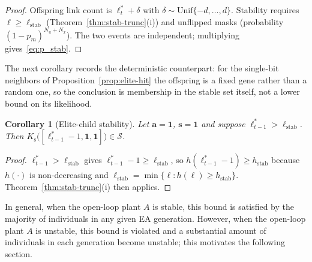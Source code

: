 \documentclass[letterpaper, 10pt, conference]{ieeeconf}
\newtheorem{corollary}{Corollary}
\begin{document}
\begin{proof}
Offspring link count is
$\ell_t^*+\delta$ with
$\delta\sim\mathrm{Unif}\{-d,\ldots,d\}$.
Stability requires
$\ell\geq\ell_{\mathrm{stab}}$
(Theorem~\ref{thm:stab-trunc}(i))
and unflipped masks (probability
$(1-p_m)^{N_u+N_x}$).
The two events are independent;
multiplying gives~\eqref{eq:p_stab}.
\end{proof}

The next corollary records the
deterministic counterpart: for the
single-bit neighbors of
Proposition~\ref{prop:elite-hit} the
offspring is a fixed gene rather than a
random one, so the conclusion is
membership in the stable set itself, not
a lower bound on its likelihood.

\begin{corollary}[Elite-child stability]
\label{cor:elite-child-stab}
Let $\mathbf{a}=\mathbf{1}$,
$\mathbf{s}=\mathbf{1}$ and suppose
$\ell_{t-1}^*>\ell_{\mathrm{stab}}$.
Then
$K_{\mathrm{s}}\bigl([\ell_{t-1}^*-1,
\mathbf{1},\mathbf{1}]\bigr)
\in\mathcal{S}$.
\end{corollary}

\begin{proof}
$\ell_{t-1}^*>\ell_{\mathrm{stab}}$
gives $\ell_{t-1}^*-1\geq
\ell_{\mathrm{stab}}$, so
$h(\ell_{t-1}^*-1)\geq
h_{\mathrm{stab}}$ because $h(\cdot)$ is
non-decreasing and
$\ell_{\mathrm{stab}}
=\min\{\ell:h(\ell)\geq
h_{\mathrm{stab}}\}$.
Theorem~\ref{thm:stab-trunc}(i) then
applies.
\end{proof}
In general, when the open-loop plant $A$ is stable, this bound is satisfied by the majority of individuals in any given EA generation. However, when the open-loop plant $A$ is unstable, this bound is violated and a substantial amount of individuals in each generation become unstable; this motivates the following section.
\end{document}
